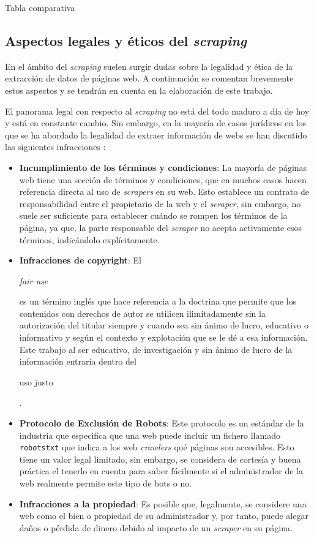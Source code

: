 Tabla comparativa

\subsection{Aspectos legales y éticos del \textit{scraping}} 

En el ámbito del \textit{scraping} suelen surgir dudas sobre la legalidad y
ética de la extracción de datos de páginas web. A continuación se comentan
brevemente estos aspectos y se tendrán en cuenta en la elaboración de este
trabajo.

El panorama legal con respecto al \textit{scraping} no está del todo maduro a
día de hoy y está en constante cambio. Sin embargo, en la mayoría de casos
jurídicos en los que se ha abordado la legalidad de extraer información de webs
se han discutido las siguientes infracciones \cite{apress2018scraping}:

\begin{itemize}
    \item \textbf{Incumplimiento de los términos y condiciones}: La mayoría de
    páginas web tiene una sección de términos y condiciones, que en muchos casos
    hacen referencia directa al uso de \textit{scrapers} en su web. Esto
    establece un contrato de responsabilidad entre el propietario de la web y el
    \textit{scraper}, sin embargo, no suele ser suficiente para establecer
    cuándo se rompen los términos de la página, ya que, la parte responsable del
    \textit{scraper} no acepta activamente esos términos, indicándolo
    explícitamente.
    \item \textbf{Infracciones de copyright}: El
    \begin{otherlanguage}{english}\textit{fair use}\end{otherlanguage} es un
    término inglés que hace referencia a la doctrina que permite que los
    contenidos con derechos de autor se utilicen ilimitadamente sin la
    autorización del titular siempre y cuando sea sin ánimo de lucro, educativo
    o informativo y según el contexto y explotación que se le dé a esa
    información. Este trabajo al ser educativo, de investigación y sin ánimo de
    lucro de la información entraría dentro del
    \begin{otherlanguage}{english}uso justo\end{otherlanguage} .
    \item \textbf{Protocolo de Exclusión de Robots}: Este protocolo es un
    estándar de la industria que especifica que una web puede incluir un fichero
    llamado \texttt{robots\.txt} que indica a los web \textit{crawlers} qué
    páginas son accesibles. Esto tiene un valor legal limitado, sin embargo, se
    considera de cortesía y buena práctica el tenerlo en cuenta para saber
    fácilmente si el administrador de la web realmente permite este tipo de bots
    o no.
    \item \textbf{Infracciones a la propiedad}: Es posible que, legalmente, se
    considere una web como el bien o propiedad de su administrador y, por tanto,
    puede alegar daños o pérdida de dinero debido al impacto de un
    \textit{scraper} en su página.
\end{itemize}

